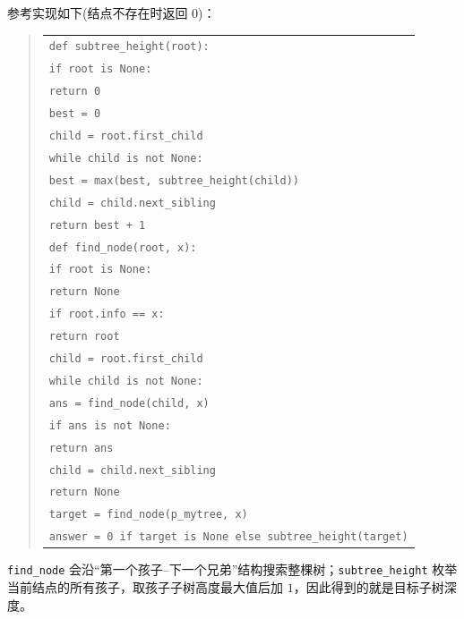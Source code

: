 \begin{question}[求子树深度]
\begin{solution}
参考实现如下(结点不存在时返回 $0$)：
\begin{quote}
\footnotesize
\begin{tabular}{@{}l@{}}
\texttt{def subtree\_height(root):}\\
\texttt{\quad if root is None:}\\
\texttt{\quad\quad return 0}\\
\texttt{\quad best = 0}\\
\texttt{\quad child = root.first\_child}\\
\texttt{\quad while child is not None:}\\
\texttt{\quad\quad best = max(best, subtree\_height(child))}\\
\texttt{\quad\quad child = child.next\_sibling}\\
\texttt{\quad return best + 1}\\[0.35em]
\texttt{def find\_node(root, x):}\\
\texttt{\quad if root is None:}\\
\texttt{\quad\quad return None}\\
\texttt{\quad if root.info == x:}\\
\texttt{\quad\quad return root}\\
\texttt{\quad child = root.first\_child}\\
\texttt{\quad while child is not None:}\\
\texttt{\quad\quad ans = find\_node(child, x)}\\
\texttt{\quad\quad if ans is not None:}\\
\texttt{\quad\quad\quad return ans}\\
\texttt{\quad\quad child = child.next\_sibling}\\
\texttt{\quad return None}\\[0.35em]
\texttt{target = find\_node(p\_mytree, x)}\\
\texttt{answer = 0 if target is None else subtree\_height(target)}
\end{tabular}
\end{quote}
\texttt{find\_node} 会沿“第一个孩子--下一个兄弟”结构搜索整棵树；\texttt{subtree\_height} 枚举当前结点的所有孩子，取孩子子树高度最大值后加 $1$，因此得到的就是目标子树深度。
\end{solution}
\end{question}

\clearpage

